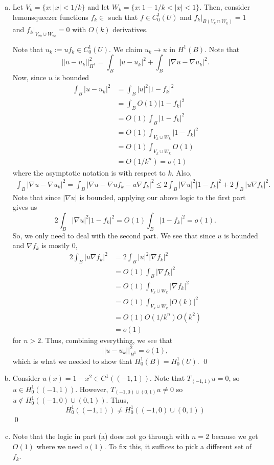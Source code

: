 \documentclass{article}
\newcommand{\D}{\nabla}
\begin{document}
\newpage
{} 
\tri
\hop 
\solution
\begin{enumerate}[(a)]
    \item Let $V_k = \{x : |x| < 1/k\}$ and let $W_k =\{x: 1- 1/k < |x| < 1\}$. Then, consider lemonsqueezer functions $f_k \in $ such that $f \in C_0^1(U)$ and $f_k|_{B(V_k \cap W_k)} = 1$ and $f_k|_{V_{2k} \cup W_{2k}} = 0$ with $O(k)$ derivatives. 
    

    Note that $u_k := uf_k \in C_0^1(U)$. We claim $u_k \to u$ in $H^1(B)$. Note that 
    \[||u-u_k||_{H^1}^2 = \int_B|u - u_k|^2+ \int_B|\D u -\D u_k|^2.\] 
    Now, since $u$ is bounded
    \begin{align*}
        \int_B |u - u_k|^2 &= \int_B|u|^2|1-f_k|^2 \\
        &= \int_BO(1)|1-f_k|^2 \\
        &=O(1) \int_B|1-f_k|^2 \\
        &=O(1) \int_{V_k \cup W_k}|1-f_k|^2 \\
        &=O(1) \int_{V_k \cup W_k}O(1) \\
        &=O(1/k^n)=o(1)
    \end{align*}
    where the asymptotic notation is with respect to $k$.
    Also, 
    \begin{align*}
        \int_B|\D u -\D u_k|^2 = \int_B|\D u -\D u f_k - u \D f_k |^2 \le 2\int_B|\D u|^2 |1-f_k|^2 + 2\int_B|u \D f_k|^2.
    \end{align*}
    Note that since $|\D u|$ is bounded, applying our above logic to the first part gives us 
    \[2\int_B|\D u|^2 |1-f_k|^2 = O(1) \int_B|1-f_k|^2 = o(1).\]
    So, we only need to deal with the second part. We see that since $u$ is bounded and $\D f_k$ is mostly 0,
    \begin{align*}
        2\int_B|u \D f_k|^2 &=  2\int_B|u|^2|\D f_k|^2\\
        &= O(1)\int_B |\D f_k|^2 \\
        &= O(1)\int_{V_k \cup W_k}|\D f_k|^2 \\
        &= O(1)\int_{V_k \cup W_k}|O(k)|^2 \\
        &= O(1) O(1/k^n) O(k^2) \\
        &= o(1)
    \end{align*}
    for $n > 2$. Thus, combining everything, we see that 
    \[||u-u_k||_{H^1}^2 = o(1),\]
    which is what we needed to show that $H_0^1(B) = H_0^1(U)$. \qed
    \item Consider $u(x) = 1- x^2 \in C^1((-1,1))$. Note that $T_{(-1,1)} u = 0$, so $u \in H_0^1((-1,1))$. However, $T_{(-1,0) \cup (0,1)}u \ne0 $ so $u \not \in H_0^1((-1,0) \cup (0,1))$. Thus, 
    \[ H_0^1((-1,1)) \ne H_0^1((-1,0) \cup (0,1))\]
    \qed
    \item Note that the logic in part (a) does not go through with $n=2$ because we get $O(1)$ where we need $o(1)$. To fix this, it suffices to pick a different set of $f_k$. 
\end{enumerate}
\end{document}

